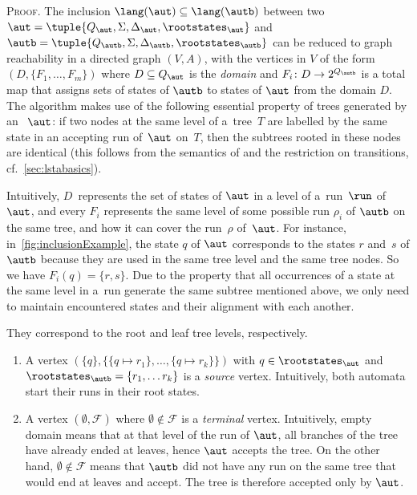 {\scshape Proof.} 
The inclusion $\lang(\aut)\subseteq\lang(\autb)$ between two \lstas $\aut=\tuple{Q_\aut,\Sigma,\Delta_\aut,\rootstates_\aut}$ and $\autb=\tuple{Q_\autb,\Sigma,\Delta_\autb,\rootstates_\autb}$ can be reduced to graph reachability in a directed graph $(V,A)$, with the vertices in $V$ of the form $(D,\{F_1,\ldots,F_m\})$ where
  $D\subseteq Q_\aut$ is the \emph{domain} and $F_i\colon D \rightarrow 2^{Q_\autb}$ is a total map that assigns sets of states of $\autb$ to states of $\aut$ from the domain $D$.
  The algorithm makes use of the following essential property of trees generated by an \lsta~$\aut$:
  if two nodes at the same level of a~tree~$T$ are labelled by the same state in
  an accepting run of~$\aut$ on~$T$, then the subtrees rooted in these nodes are
  identical (this follows from the semantics of \lstas and the restriction on
  transitions, cf.\ \cref{sec:lstabasics}).

\inclusionExample

Intuitively, $D$~represents the set of states of $\aut$ in a level of a~run~$\run$ of $\aut$, and every $F_i$ represents the same level of some possible run $\rho_i$ of $\autb$ on the same tree, and how it
can cover the run~$\rho$ of~$\aut$.
For instance, in~\cref{fig:inclusionExample}, the state $q$ of $\aut$ corresponds to the states $r$ and~$s$ of $\autb$ because they are used in the same tree level and the same tree nodes. So we have $F_i(q) = \{r,s\}$.
Due to the property that all occurrences of a state at the same level in a~run
generate the same subtree mentioned above, we only need to maintain encountered
states and their alignment with each another.

They correspond to the root and leaf tree levels, respectively. 

\begin{enumerate}
\item A vertex $(\{q\},\{\{q\mapsto r_1\}, \ldots,\{q\mapsto r_k\}\})$ with $q\in \rootstates_\aut$ and $\rootstates_\autb = \{r_1,\ldots r_k\}$ is a \emph{source} vertex. Intuitively, both automata start their runs in their root states.
\item A vertex $(\emptyset, \mathcal{F})$ where $\emptyset \not\in \mathcal{F}$ is a \emph{terminal} vertex. Intuitively, empty domain means that at that level of the run of $\aut$, all branches of the tree have already ended at leaves, hence $\aut$ accepts the tree. On the other hand, $\emptyset \not\in \mathcal{F}$ means that $\autb$ did not have any run on the same tree that would end at leaves and accept. The tree is therefore accepted only by $\aut$. 
\end{enumerate}


